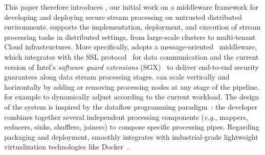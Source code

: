 This paper therefore introduces \SYS{}, our initial work on a middleware framework for developing and deploying secure stream processing on untrusted distributed environments.
\SYS{} supports the implementation, deployment, and execution of stream processing tasks in distributed settings, from large-scale clusters to multi-tenant Cloud infrastructures.
More specifically, \SYS{} adopts a message-oriented~\cite{mom} middleware, which integrates with the SSL protocol~\cite{freier2011secure} for data communication and the current version of Intel{\textregistered}'s \emph{software guard extensions} (SGX)~\cite{costan_intel} to deliver end-to-end security guarantees along data stream processing stages.
\SYS{} can scale vertically and horizontally by adding or removing processing nodes at any stage of the pipeline, for example to dynamically adjust according to the current workload.
%
%
The design of the \SYS{} system is inspired by the dataflow programming paradigm~\cite{uustalu_essence_2005}: the developer combines together several independent processing components (\emph{e.g.}, mappers, reducers, sinks, shufflers, joiners) to compose specific processing pipes.
Regarding packaging and deployment, \SYS{} smoothly integrates with industrial-grade lightweight virtualization technologies like Docker~\cite{docker}.



